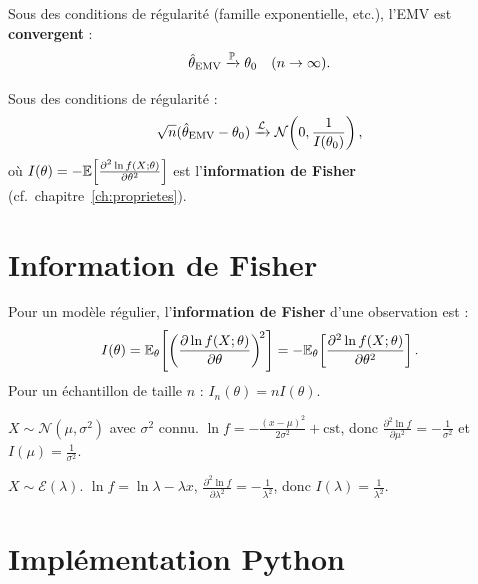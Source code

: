 \begin{theoreme}
Sous des conditions de r\'egularit\'e (famille exponentielle, etc.), l'EMV est \textbf{convergent} :
\[
\hat{\theta}_{\mathrm{EMV}} \xrightarrow{\mathbb{P}} \theta_0 \quad (n\to\infty).
\]
\end{theoreme}

\begin{theoreme}
\label{thm:normalite-emv}
Sous des conditions de r\'egularit\'e :
\[
\sqrt{n}(\hat{\theta}_{\mathrm{EMV}}-\theta_0) \xrightarrow{\mathcal{L}} \mathcal{N}\!\left(0, \frac{1}{I(\theta_0)}\right),
\]
o\`u $I(\theta)=-\mathbb{E}\!\left[\frac{\partial^2 \ln f(X;\theta)}{\partial\theta^2}\right]$ est l'\textbf{information de Fisher} (cf.\ chapitre~\ref{ch:proprietes}).
\end{theoreme}

\section{Information de Fisher}

\begin{definition}
Pour un mod\`ele r\'egulier, l'\textbf{information de Fisher} d'une observation est :
\[
I(\theta) = \mathbb{E}_\theta\!\left[\left(\frac{\partial \ln f(X;\theta)}{\partial\theta}\right)^{\!2}\right] = -\mathbb{E}_\theta\!\left[\frac{\partial^2 \ln f(X;\theta)}{\partial\theta^2}\right].
\]
Pour un \'echantillon de taille $n$ : $I_n(\theta)=nI(\theta)$.
\end{definition}

\begin{exemple}
$X\sim\mathcal{N}(\mu,\sigma^2)$ avec $\sigma^2$ connu. $\ln f = -\frac{(x-\mu)^2}{2\sigma^2}+\text{cst}$, donc $\frac{\partial^2\ln f}{\partial\mu^2}=-\frac{1}{\sigma^2}$ et $I(\mu)=\frac{1}{\sigma^2}$.
\end{exemple}

\begin{exemple}
$X\sim\mathcal{E}(\lambda)$. $\ln f = \ln\lambda - \lambda x$, $\frac{\partial^2\ln f}{\partial\lambda^2}=-\frac{1}{\lambda^2}$, donc $I(\lambda)=\frac{1}{\lambda^2}$.
\end{exemple}

\section{Impl\'ementation Python}

